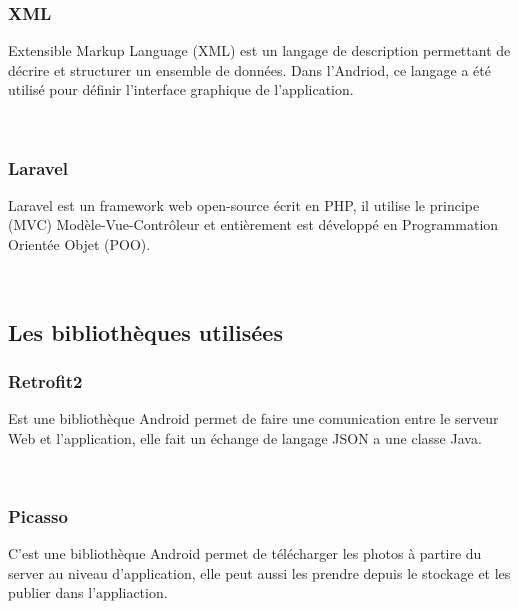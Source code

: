 \documentclass[french,a4,12pt]{report}
\begin{document}
	\subsubsection*{XML}
\begin{minipage}{0.5\textwidth}
Extensible Markup Language (XML) est un  langage de description permettant de décrire et structurer un ensemble de données. Dans l'Andriod, ce langage a été utilisé pour définir l'interface graphique de l'application.
\end{minipage}
~
	\subsubsection*{Laravel}
\begin{minipage}{0.5\textwidth}
Laravel est un framework web open-source écrit en PHP, il utilise le principe (MVC) Modèle-Vue-Contrôleur et entièrement est développé en Programmation Orientée Objet (POO).
\end{minipage}
~
\newpage
\begin{tcolorbox}[colframe=green!75,rightrule=0.5cm,leftrule=0.5cm,]
	\centering
	\subsection{Les bibliothèques utilisées}
\end{tcolorbox}
\subsubsection*{Retrofit2}
\begin{minipage}{0.5\textwidth}
Est une bibliothèque Android permet de faire une comunication entre le serveur Web et l'application, elle fait un échange de langage JSON a une classe Java. 
\end{minipage}
~
	\subsubsection*{Picasso}
\begin{minipage}{0.5\textwidth}
	
C'est une bibliothèque Android permet de télécharger les photos à partire du server au niveau d'application, elle peut aussi les prendre depuis le stockage et les publier dans l'appliaction. 
\end{minipage}
~
%
\end{document}
